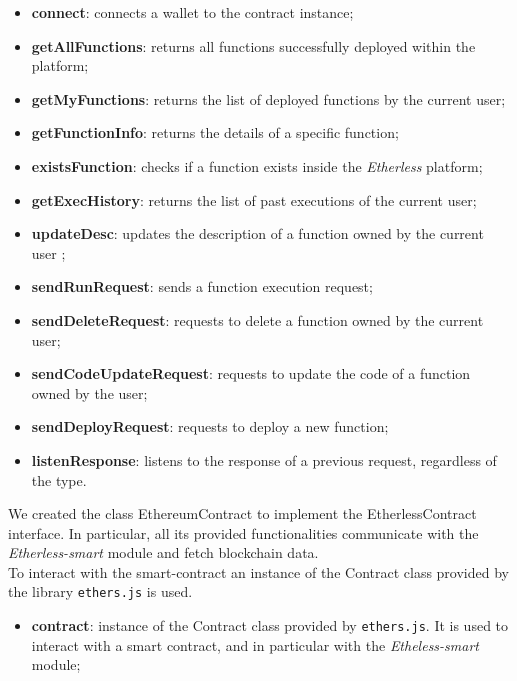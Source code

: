 					\begin{itemize}
						\item \textbf{connect}: connects a wallet to the contract instance;
						\item \textbf{getAllFunctions}: returns all functions successfully deployed within the platform;
						\item \textbf{getMyFunctions}: returns the list of deployed functions by the current user;
						\item \textbf{getFunctionInfo}: returns the details of a specific function;
						\item \textbf{existsFunction}: checks if a function exists inside the \textit{Etherless} platform;
						\item \textbf{getExecHistory}: returns the list of past executions of the current user;
						\item \textbf{updateDesc}: updates the description of a function owned by the current user ;
						\item \textbf{sendRunRequest}: sends a function execution request;
						\item \textbf{sendDeleteRequest}: requests to delete a function owned by the current user; 
						\item \textbf{sendCodeUpdateRequest}: requests to update the code of a function owned by the user; 
						\item \textbf{sendDeployRequest}: requests to deploy a new function; 
						\item \textbf{listenResponse}: listens to the response of a previous request, regardless of the type.
					\end{itemize}
		
			We created the class EthereumContract to implement the EtherlessContract interface. In particular, all its provided functionalities communicate with the \textit{Etherless-smart} module and fetch blockchain data. \\ To interact with the smart-contract an instance of the Contract class provided by the library \texttt{ethers.js} is used.
					\begin{itemize}
						\item \textbf{contract}: instance of the Contract class provided by \texttt{ethers.js}. It is used to interact with a smart contract, and in particular with the \textit{Etheless-smart} module; 
					\end{itemize}
				
